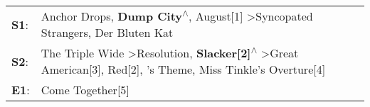 \begin{supertabular}{p{0.03\textwidth}p{0.92\textwidth}}
 \textbf{S1}:  &                                                                                                     Anchor Drops\textsuperscript{}, \enspace \textbf{Dump City\textsuperscript{$\wedge$}}, \enspace August[1]\textsuperscript{} \textgreater \enspace Syncopated Strangers\textsuperscript{}, \enspace Der Bluten Kat\textsuperscript{}  \enspace  \\
 \textbf{S2}:  &  The Triple Wide\textsuperscript{} \textgreater \enspace Resolution\textsuperscript{}, \enspace \textbf{Slacker[2]\textsuperscript{$\wedge$}} \textgreater \enspace Great American[3]\textsuperscript{}, \enspace Red[2]\textsuperscript{}, 's Theme\textsuperscript{}, \enspace Miss Tinkle's Overture[4]\textsuperscript{}  \enspace  \\
 \textbf{E1}:  &                                                                                                                                                                                                                                                                                                      Come Together[5]\textsuperscript{}  \enspace  \\
\end{supertabular}
